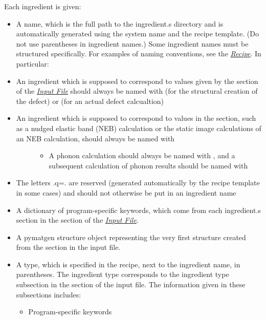 \documentclass[letterpaper,10pt,english]{sphinxmanual}
\begin{document}
Each ingredient is given:
\begin{itemize}
\item {} 
A name, which is the full path to the ingredient.s directory and is automatically generated using the system name and the recipe template. (Do not use parentheses in ingredient names.) Some ingredient names must be structured specifically. For examples of naming conventions, see the {\hyperref[4_0_recipe::doc]{\emph{Recipe}}}. In particular:

\item {} 
An ingredient which is supposed to correspond to values given by the  section of the {\hyperref[3_0_inputfile::doc]{\emph{Input File}}} should always be named with  (for the structural creation of the defect) or  (for an actual defect calcualtion)

\item {} \begin{description}
\item[{An ingredient which is supposed to correspond to values in the  section, such as a nudged elastic band (NEB) calculation or the static image calculations of an NEB calculation, should always be named with }] \leavevmode\begin{itemize}
\item {} 
A phonon calculation should always be named with , and a subsequent calculation of phonon results should be named with 

\end{itemize}

\end{description}

\item {} 
The letters .q=. are reserved (generated automatically by the recipe template in some cases) and should not otherwise be put in an ingredient name

\item {} 
A dictionary of program-specific keywords, which come from each ingredient.s section in the  section of the {\hyperref[3_0_inputfile::doc]{\emph{Input File}}}.

\item {} 
A pymatgen structure object representing the very first structure created from the  section in the input file.

\item {} 
A type, which is specified in the recipe, next to the ingredient name, in parentheses. The ingredient type corresponds to the ingredient type subsection in the  section of the input file. The information given in these subsections includes:
\begin{itemize}
\item {} 
Program-specific keywords


\end{itemize}
\end{itemize}
\end{document}
